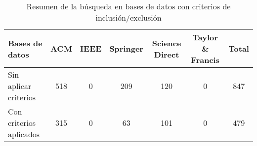 \begin{table}[H]
	\centering
	\scriptsize
	\setlength{\tabcolsep}{4pt}
	\renewcommand{\arraystretch}{1.1}
	\begin{tabular}{|l|c|c|c|c|c|c|}
		\hline
		\textbf{Bases de datos} & \textbf{ACM} & \textbf{IEEE} & \textbf{Springer} & \textbf{Science Direct} & \textbf{Taylor \& Francis} & \textbf{Total} \\
		\hline
		Sin aplicar criterios   & 518          & 0             & 209               & 120                     & 0                          & 847            \\
		\hline
		Con criterios aplicados & 315          & 0             & 63                & 101                     & 0                          & 479            \\
		\hline
	\end{tabular}
	\caption{Resumen de la búsqueda en bases de datos con criterios de inclusión/exclusión}
	\label{tab:bases-sin-criterio}
\end{table}
